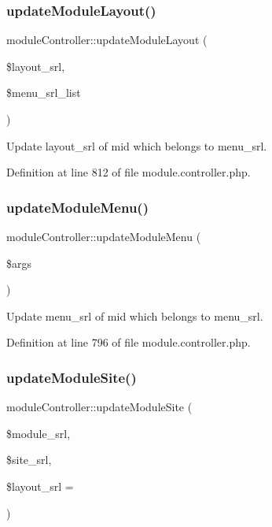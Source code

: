 \subsubsection{\texorpdfstring{update\+Module\+Layout()}{updateModuleLayout()}}
{\footnotesize\ttfamily module\+Controller\+::update\+Module\+Layout (\begin{DoxyParamCaption}\item[{}]{\$layout\+\_\+srl,  }\item[{}]{\$menu\+\_\+srl\+\_\+list }\end{DoxyParamCaption})}



Update layout\+\_\+srl of mid which belongs to menu\+\_\+srl. 



Definition at line 812 of file module.\+controller.\+php.

\mbox{\label{classmoduleController_a7583bb9beb47ba3ecc1149546716e9f7}} 
\subsubsection{\texorpdfstring{update\+Module\+Menu()}{updateModuleMenu()}}
{\footnotesize\ttfamily module\+Controller\+::update\+Module\+Menu (\begin{DoxyParamCaption}\item[{}]{\$args }\end{DoxyParamCaption})}



Update menu\+\_\+srl of mid which belongs to menu\+\_\+srl. 



Definition at line 796 of file module.\+controller.\+php.

\mbox{\label{classmoduleController_a9b1b3b8db4047c33882a9231c5eafb13}} 
\subsubsection{\texorpdfstring{update\+Module\+Site()}{updateModuleSite()}}
{\footnotesize\ttfamily module\+Controller\+::update\+Module\+Site (\begin{DoxyParamCaption}\item[{}]{\$module\+\_\+srl,  }\item[{}]{\$site\+\_\+srl,  }\item[{}]{\$layout\+\_\+srl = {} }\end{DoxyParamCaption})}



